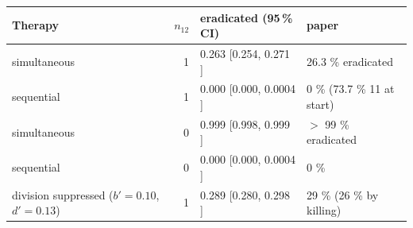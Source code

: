\begin{tabular}{lrll}
\toprule
Therapy & $n_{12}$ & eradicated (95\,\% CI) & paper \\
\midrule
simultaneous & 1 & 0.263 [0.254, 0.271 ] & 26.3 \% eradicated \\
sequential & 1 & 0.000 [0.000, 0.0004 ] & 0 \% (73.7 \% 11 at start) \\
simultaneous & 0 & 0.999 [0.998, 0.999 ] & $>$ 99 \% eradicated \\
sequential & 0 & 0.000 [0.000, 0.0004 ] & 0 \% \\
division suppressed ($b'=0.10$, $d'=0.13$) & 1 & 0.289 [0.280, 0.298 ] & 29 \% (26 \% by killing) \\
\bottomrule
\end{tabular}
